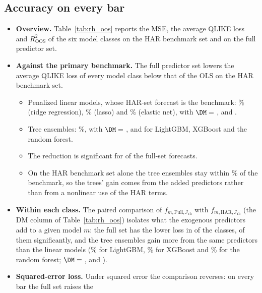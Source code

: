 \subsection{Accuracy on every bar}
\label{sec:rh_results_oos}
\label{sec:rh_results_predictors}
\begin{itemize}
\item \textbf{Overview.} Table~\ref{tab:rh_oos} reports the MSE, the average QLIKE loss and $R^2_{\mathrm{OOS}}$ of
  the six model classes on the HAR benchmark set and on the full predictor set.
\item \textbf{Against the primary benchmark.} The full predictor set lowers the average QLIKE loss of every model
  class below that of the OLS on the HAR benchmark set.
  \begin{itemize}
  \item Penalized linear models, whose HAR-set forecast is the benchmark: \rhorVsOlsPctRidgeFull\% (ridge regression),
    \rhorVsOlsPctLassoFull\% (lasso) and \rhorVsOlsPctEnetFull\% (elastic net), with $\DM={}$\rhorDmRidgeB,
    \rhorDmLassoB{} and \rhorDmEnetB.
  \item Tree ensembles: \rhorVsOlsRedTreeRng{}\%, with $\DM={}$\rhorVsOlsDmLgbmFull,
    \rhorVsOlsDmXgbFull{} and \rhorVsOlsDmRfFull{} for LightGBM, XGBoost and the random forest.
  \item The reduction is significant for \rhorVsOlsLowerSig{} of the \rhorAfPairs{} full-set forecasts.
  \item On the HAR benchmark set alone the tree ensembles stay within \rhorVsOlsPctTreeHarMaxAbs\% of the
    benchmark, so the trees' gain comes from the added predictors rather than from a nonlinear use of the HAR terms.
  \end{itemize}
\item \textbf{Within each class.} The paired comparison of $f_{m,\mathrm{Full},\mathcal I_{\mathrm{rh}}}$ with
  $f_{m,\mathrm{HAR},\mathcal I_{\mathrm{rh}}}$ (the DM column of Table~\ref{tab:rh_oos}) isolates what the exogenous
  predictors add to a given model $m$: the full set has the lower loss in \rhorAfLower{} of the \rhorAfPairs{}
  classes, \rhorAfLowerSig{} of them significantly, and the tree ensembles gain more from the same predictors than the
  linear models (\rhabLgbmFullAllPct\% for LightGBM, \rhabXgbFullAllPct\% for XGBoost and \rhabRfFullAllPct\% for the
  random forest; $\DM={}$\rhorDmLgbmB, \rhorDmXgbB{} and \rhorDmRfB).
\item \textbf{Squared-error loss.} Under squared error the comparison reverses: on every bar the full set raises the

\end{itemize}
